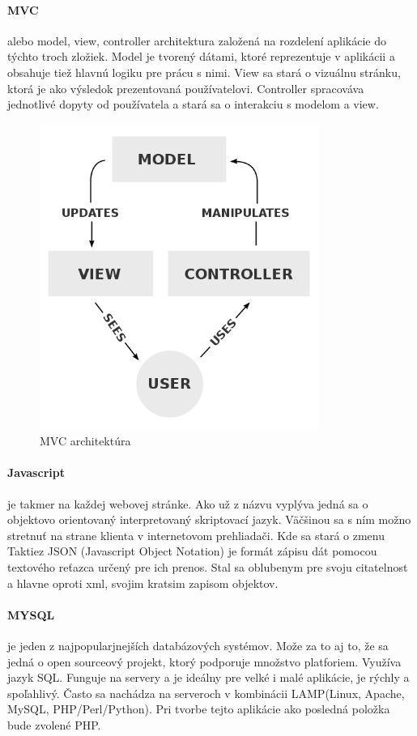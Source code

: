 \paragraph{MVC} alebo model, view, controller architektura založená na rozdelení aplikácie do týchto troch zložiek. Model je tvorený dátami, ktoré reprezentuje v aplikácii a obsahuje tiež hlavnú logiku pre prácu s nimi. View sa stará o vizuálnu stránku, ktorá je ako výsledok prezentovaná používatelovi. Controller spracováva jednotlivé dopyty od používatela a stará sa o interakciu s modelom a view.
\begin{figure}[h]
  \centering
  \includegraphics[height=10cm]{mainmatter/imgs/mvc.png}
  \caption{MVC architektúra}
  \label{fig:comenius}
\end{figure}


\paragraph{Javascript} je takmer na každej webovej stránke. Ako už z názvu vyplýva jedná sa o objektovo orientovaný interpretovaný skriptovací jazyk. Väčšinou sa s ním možno stretnuť na strane klienta v internetovom prehliadači. Kde sa stará o zmenu Taktiez JSON (Javascript Object Notation) je formát zápisu dát pomocou textového reťazca určený pre ich prenos. Stal sa oblubenym pre svoju citatelnost a hlavne oproti xml, svojim kratsim zapisom objektov. 

\paragraph{MYSQL} je jeden z najpopularjnejších databázových systémov. Može za to aj to, že sa jedná o open sourceový projekt, ktorý podporuje množstvo platforiem. Využíva jazyk SQL. Funguje na servery a je ideálny pre velké i malé aplikácie, je rýchly a spoľahlivý. Často sa nachádza na serveroch v kombinácii LAMP(Linux, Apache, MySQL, PHP/Perl/Python). Pri tvorbe tejto aplikácie ako posledná položka bude zvolené PHP.

